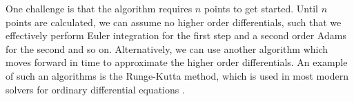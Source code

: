 One challenge is that the algorithm requires $n$ points to get started. Until  $n$ points are calculated, we can assume no higher order differentials, such that we effectively perform Euler integration for the first step and a second order Adams for the second and so on. Alternatively, we can use another algorithm which moves forward in time to approximate the higher order differentials. An example of such an algorithms is the Runge-Kutta method, which is used in most modern solvers for ordinary differential equations \cite{butcher_numerical_2000}. 




